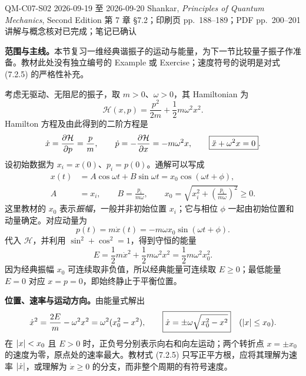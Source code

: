 \studymeta
  {QM-C07-S02}
  {2026-09-19 至 2026-09-20}
  {Shankar, \textit{Principles of Quantum Mechanics}, Second Edition}
  {第 7 章 \S 7.2；印刷页 pp.~188--189；PDF pp.~200--201}
  {讲解与概念核对已完成；笔记已确认}

\textbf{范围与主线。}本节复习一维经典谐振子的运动与能量，为下一节比较量子振子作准备。教材此处没有独立编号的 Example 或 Exercise；速度符号的说明是对式 (7.2.5) 的严格性补充。



考虑无驱动、无阻尼的振子，取 $m>0$、$\omega>0$，其 Hamiltonian 为
\begin{equation}
  \mathcal H(x,p)=\frac{p^2}{2m}+\frac12m\omega^2x^2.
\end{equation}
Hamilton 方程及由此得到的二阶方程是
\begin{equation}
  \dot x=\frac{\partial \mathcal H}{\partial p}=\frac{p}{m},\qquad
  \dot p=-\frac{\partial \mathcal H}{\partial x}=-m\omega^2x,
  \qquad
  \boxed{\ddot x+\omega^2x=0}.
  \label{eq:QM-C07-S02-motion}
\end{equation}
设初始数据为 $x_i=x(0)$、$p_i=p(0)$。通解可以写成
\begin{align}
  x(t)&=A\cos\omega t+B\sin\omega t
       =x_0\cos(\omega t+\phi),\\
  A&=x_i,\qquad B=\frac{p_i}{m\omega},\qquad
  x_0=\sqrt{x_i^2+\left(\frac{p_i}{m\omega}\right)^2}\ge0.
  \label{eq:QM-C07-S02-solution}
\end{align}
这里教材的 $x_0$ 表示\emph{振幅}，一般并非初始位置 $x_i$；它与相位 $\phi$ 一起由初始位置和动量确定。对应动量为
\begin{equation}
  p(t)=m\dot x(t)=-m\omega x_0\sin(\omega t+\phi).
\end{equation}
代入 $\mathcal H$，并利用 $\sin^2+\cos^2=1$，得到守恒的能量
\begin{equation}
  \boxed{E=\frac12m\dot x^2+\frac12m\omega^2x^2
         =\frac12m\omega^2x_0^2}.
  \label{eq:QM-C07-S02-energy}
\end{equation}
因为经典振幅 $x_0$ 可连续取非负值，所以经典能量可连续取 $E\ge0$；最低能量 $E=0$ 对应 $x=p=0$，即始终静止于平衡位置。

\textbf{位置、速率与运动方向。}由能量式解出
\begin{equation}
  \dot x^2=\frac{2E}{m}-\omega^2x^2
            =\omega^2(x_0^2-x^2),
  \qquad
  \boxed{\dot x=\pm\omega\sqrt{x_0^2-x^2}}
  \quad (\left|x\right|\le x_0).
  \label{eq:QM-C07-S02-velocity-branches}
\end{equation}
在 $\left|x\right|<x_0$ 且 $E>0$ 时，正负号分别表示向右和向左运动；两个转折点 $x=\pm x_0$ 的速度为零，原点处的速率最大。教材式 (7.2.5) 只写正平方根，应将其理解为速率 $\left|\dot x\right|$，或理解为 $\dot x\ge0$ 的分支，而非整个周期的有符号速度。

